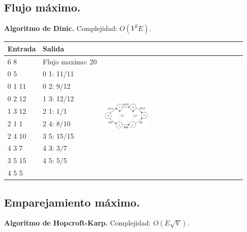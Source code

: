 \documentclass[11pt, letterpaper, twoside]{article}
\begin{document}
\subsection{Flujo máximo.}

\textbf{Algoritmo de Dinic.} Complejidad: $O(V^2 E)$.



\begin{tabular}{|p{4cm}|p{4cm}|p{7.5cm}|}
\hline
\textbf{Entrada} & \textbf{Salida} & \\ \hline
6 8    & Flujo maximo: 20 & \multirow{10}{*}{\includegraphics[width = 0.33\textwidth]{Grafos/Imagenes/MaxFlow.png}} \\
0 5    & 0 1: 11/11 & \\ 
0 1 11 & 0 2: 9/12  & \\
0 2 12 & 1 3: 12/12 & \\
1 3 12 & 2 1: 1/1   & \\
2 1 1  & 2 4: 8/10  & \\
2 4 10 & 3 5: 15/15 & \\
4 3 7  & 4 3: 3/7   & \\
3 5 15 & 4 5: 5/5   & \\
4 5 5  &            & \\ \hline
\end{tabular}

\subsection{Emparejamiento máximo.}

\textbf{Algoritmo de Hopcroft-Karp.} Complejidad: $O(E \sqrt{V})$.


\end{document}

